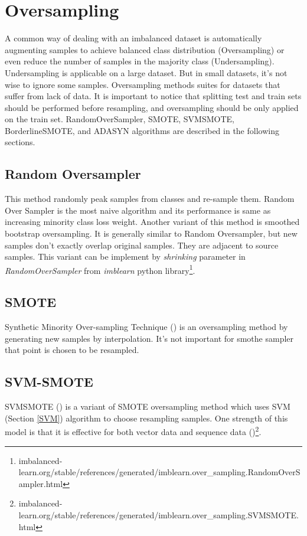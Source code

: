 \section{Oversampling}
\label{lr:oversampling}
A common way of dealing with an imbalanced dataset is automatically augmenting samples to achieve balanced class distribution (Oversampling) or even reduce the number of samples in the majority class (Undersampling). Undersampling is applicable on a large dataset. But in small datasets, it's not wise to ignore some samples. Oversampling methods suites for datasets that suffer from lack of data. It is important to notice that splitting test and train sets should be performed before resampling, and oversampling should be only applied on the train set. RandomOverSampler, SMOTE, SVMSMOTE, BorderlineSMOTE, and \ac{ADASYN} algorithms are described in the following sections.

\subsection{Random Oversampler} 
This method randomly peak samples from classes and re-sample them. Random Over Sampler is the most naive algorithm and its performance is same as increasing minority class loss weight. Another variant of this method is smoothed bootstrap oversampling. It is generally similar to Random Oversampler, but new samples don't exactly overlap original samples. They are adjacent to source samples. This variant can be implement by \textit{shrinking} parameter in \textit{RandomOverSampler} from \textit{imblearn} python library\footnote{imbalanced-learn.org/stable/references/generated/imblearn.over\_sampling.RandomOverSampler.html}. 
	
\subsection{SMOTE}
Synthetic Minority Over-sampling Technique (\cite{smothe}) is an oversampling method by generating new samples by interpolation. It's not important for smothe sampler that point is chosen to be resampled. 
	
\subsection{SVM-SMOTE } 
SVMSMOTE (\cite{svmsmothe}) is a variant of SMOTE oversampling method which uses SVM (Section \ref{SVM}) algorithm to choose resampling samples. One strength of this model is that it is effective for both vector data and sequence data (\cite{svmsmothe})\footnote{imbalanced-learn.org/stable/references/generated/imblearn.over\_sampling.SVMSMOTE.html}.
	
